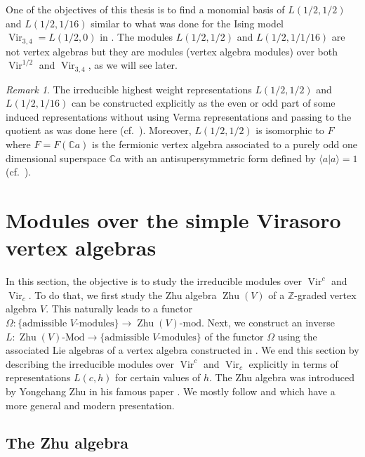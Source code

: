 \documentclass[a4paper, 12pt, reqno]{amsart}
\theoremstyle{remark}
\newtheorem{remark}[theorem]{Remark}
\numberwithin{equation}{subsection}
\DeclareMathOperator{\Vir}{Vir}
\DeclareMathOperator{\one}{\overline{1}}
\DeclareMathOperator{\Zhu}{Zhu}
\begin{document}
One of the objectives of this thesis is to find a monomial basis of $L(1/2, 1/2)$ and $L(1/2, 1/16)$ similar to what was done for the Ising model $\Vir_{3, 4} = L(1/2, 0)$ in \cite{andrews_singular_2022}.
The modules $L(1/2, 1/2)$ and $L(1/2, 1/1/16)$ are not vertex algebras but they are modules (vertex algebra modules) over both $\Vir^{1/2}$ and $\Vir_{3, 4}$, as we will see later.

\begin{remark}
  \label{rmk:30}
  The irreducible highest weight representations $L(1/2, 1/2)$ and $L(1/2, 1/16)$ can be constructed explicitly as the even or odd part of some induced representations without using Verma representations and passing to the quotient as was done here (cf.\ \cite[\S3]{kac_bombay_2013}).
  Moreover, $L(1/2, 1/2)$ is isomorphic to $F_{\one}$ where $F = F(\mathbb{C}a)$ is the fermionic vertex algebra associated to a purely odd one dimensional superspace $\mathbb{C}a$ with an antisupersymmetric form defined by $\langle a| a\rangle = 1$ (cf.\ ).
\end{remark}

\section{Modules over the simple Virasoro vertex algebras}
\label{sec:modules-over-simple}

In this section, the objective is to study the irreducible modules over $\Vir^c$ and $\Vir_c$.
To do that, we first study the Zhu algebra $\Zhu(V)$ of a $\mathbb{Z}$-graded vertex algebra $V$.
This naturally leads to a functor $\Omega: \{\text{admissible $V$-modules}\} \to \Zhu(V)\text{-mod}$.
Next, we construct an inverse $L: \Zhu(V)\text{-Mod} \to \{\text{admissible $V$-modules}\}$ of the functor $\Omega$ using the associated Lie algebras of a vertex algebra constructed in .
We end this section by describing the irreducible modules over $\Vir^c$ and $\Vir_c$ explicitly in terms of representations $L(c, h)$ for certain values of $h$.
The Zhu algebra was introduced by Yongchang Zhu in his famous paper \cite{zhu_modular_1996}.
We mostly follow \cite{de_sole_finite_2006} and \cite{dong_twisted_1998} which have a more general and modern presentation.

\subsection{The Zhu algebra}
\label{sec:zhu-algebra-1}
\end{document}

